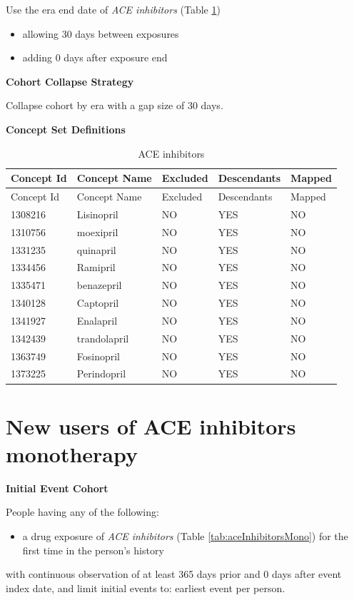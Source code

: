 \documentclass[11pt]{book}
\providecommand{\tightlist}{%
  \setlength{\itemsep}{0pt}\setlength{\parskip}{0pt}}
\theoremstyle{definition}
\theoremstyle{definition}
\theoremstyle{definition}
\theoremstyle{remark}
\begin{document}
Use the era end date of \emph{ACE inhibitors} (Table \ref{tab:aceInhibitors})

\begin{itemize}
\tightlist
\item
  allowing 30 days between exposures
\item
  adding 0 days after exposure end
\end{itemize}

\textbf{Cohort Collapse Strategy}

Collapse cohort by era with a gap size of 30 days.

\textbf{Concept Set Definitions}

\begin{longtable}[]{@{}lllll@{}}
\caption{\label{tab:aceInhibitors} ACE inhibitors}\tabularnewline
\toprule
Concept Id & Concept Name & Excluded & Descendants & Mapped\tabularnewline
\midrule
\endfirsthead
\toprule
Concept Id & Concept Name & Excluded & Descendants & Mapped\tabularnewline
\midrule
\endhead
1308216 & Lisinopril & NO & YES & NO\tabularnewline
1310756 & moexipril & NO & YES & NO\tabularnewline
1331235 & quinapril & NO & YES & NO\tabularnewline
1334456 & Ramipril & NO & YES & NO\tabularnewline
1335471 & benazepril & NO & YES & NO\tabularnewline
1340128 & Captopril & NO & YES & NO\tabularnewline
1341927 & Enalapril & NO & YES & NO\tabularnewline
1342439 & trandolapril & NO & YES & NO\tabularnewline
1363749 & Fosinopril & NO & YES & NO\tabularnewline
1373225 & Perindopril & NO & YES & NO\tabularnewline
\bottomrule
\end{longtable}

\hypertarget{AceInhibitorsMono}{%
\section{New users of ACE inhibitors monotherapy}\label{AceInhibitorsMono}}

\textbf{Initial Event Cohort}

People having any of the following:

\begin{itemize}
\tightlist
\item
  a drug exposure of \emph{ACE inhibitors} (Table \ref{tab:aceInhibitorsMono}) for the first time in the person's history
\end{itemize}

with continuous observation of at least 365 days prior and 0 days after event index date, and limit initial events to: earliest event per person.
\end{document}
